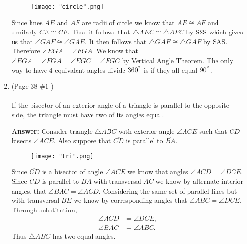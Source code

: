\documentclass[12pt]{amsart}
\theoremstyle{remark}
\theoremstyle{mycomment}
\begin{document}
\begin{enumerate}
\begin{figure}[H]
\caption{}
\centering
\texttt{[image: "circle".png]}
\end{figure}

Since lines $\overline{AE}$ and $\overline{AF}$ are radii of circle we know that $\overline{AE} \cong \overline{AF}$ and similarly $\overline{CE} \cong \overline{CF}$. Thus it follows that  $\triangle AEC \cong \triangle AFC$ by SSS which gives us that $\angle GAF \cong \angle GAE$. It then follows that $\triangle GAE \cong \triangle GAF$ by SAS. Therefore $\angle EGA = \angle FGA$. We know that $\angle EGA = \angle FGA = \angle EGC = \angle FGC$ by Vertical Angle Theorem. The only way to have 4 equivalent angles divide $360^ {\degree}$ is if they all equal $90^ {\degree}$.
\vspace{1in}

\item(Page $38$  $\#1$ )\\
\\
 If the bisector of an exterior angle of a triangle is parallel to the opposite
side, the triangle must have two of its angles equal.

\textbf{Answer:} Consider triangle $\triangle ABC$ with exterior angle $\angle ACE$ such that $\overline{CD}$ bisects $\angle ACE$. Also suppose that $\overline{CD}$ is parallel to $\overline{BA}$.

\begin{figure}[H]
\caption{}
\centering
\texttt{[image: "tri".png]}
\end{figure}

Since $\overline{CD}$ is a bisector of angle $\angle ACE$ we know that angles $\angle ACD = \angle DCE$. Since $\overline{CD}$ is parallel to $\overline{BA}$ with transversal $\overline{AC}$ we know by alternate interior angles, that $\angle BAC = \angle ACD$. Considering the same set of parallel lines but with transversal $\overline{BE}$ we know by corresponding angles that $\angle ABC = \angle DCE$. Through substitution, 
\begin{align}
\angle ACD &= \angle DCE,\\
\angle BAC &=\angle ABC.
\end{align}
Thus $\triangle ABC$ has two equal angles. 

\vspace{1in}

\end{enumerate}
 
\end{document}
